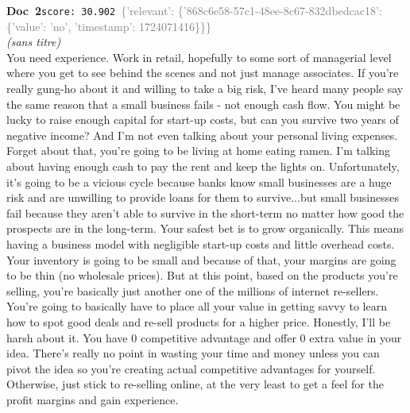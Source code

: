 \documentclass[a4paper,11pt]{article}
\begin{document}
\begin{docenv}
{\footnotesize\textcolor{doccolor}{\textbf{Doc~2}}}\hfill{\tiny\texttt{score:~30.902}}\ {\tiny\textcolor{gray}{\{'relevant': \{'868c6e58-57c1-48ee-8c67-832dbedcac18': \{'value': 'no', 'timestamp': 1724071416\}\}\}}}\\[3pt]
{\small\textit{(sans titre)}}\\[2pt]
\vspace{2pt}
{\footnotesize 
You need experience. Work in retail, hopefully to some sort of managerial level where you get to see behind the scenes and not just manage associates.  If you're really gung-ho about it and willing to take a big risk, I've heard many people say the same reason that a small business fails - not enough cash flow. You might be lucky to raise enough capital for start-up costs, but can you survive two years of negative income? And I'm not even talking about your personal living expenses. Forget about that, you're going to be living at home eating ramen. I'm talking about having enough cash to pay the rent and keep the lights on. Unfortunately, it's going to be a vicious cycle because banks know small businesses are a huge risk and are unwilling to provide loans for them to survive...but small businesses fail because they aren't able to survive in the short-term no matter how good the prospects are in the long-term.   Your safest bet is to grow organically. This means having a business model with negligible start-up costs and little overhead costs. Your inventory is going to be small and because of that, your margins are going to be thin (no wholesale prices). But at this point, based on the products you're selling, you're basically just another one of the millions of internet re-sellers. You're going to basically have to place all your value in getting savvy to learn how to spot good deals and re-sell products for a higher price.   Honestly, I'll be harsh about it. You have 0 competitive advantage and offer 0 extra value in your idea. There's really no point in wasting your time and money unless you can pivot the idea so you're creating actual competitive advantages for yourself. Otherwise, just stick to re-selling online, at the very least to get a feel for the profit margins and gain experience.}
\end{docenv}
\end{document}
